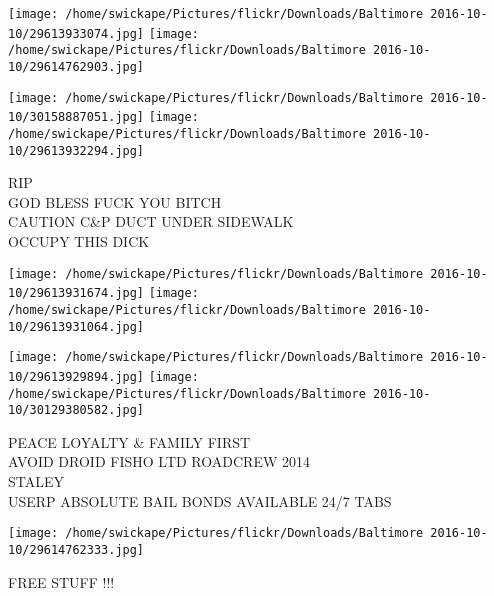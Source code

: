 \documentclass[10pt,letterpaper]{article}
\begin{document}
\texttt{[image: /home/swickape/Pictures/flickr/Downloads/Baltimore 2016-10-10/29613933074.jpg]}
\texttt{[image: /home/swickape/Pictures/flickr/Downloads/Baltimore 2016-10-10/29614762903.jpg]}

\texttt{[image: /home/swickape/Pictures/flickr/Downloads/Baltimore 2016-10-10/30158887051.jpg]}
\texttt{[image: /home/swickape/Pictures/flickr/Downloads/Baltimore 2016-10-10/29613932294.jpg]}

RIP\\
GOD BLESS FUCK YOU BITCH\\
CAUTION C\&P DUCT UNDER SIDEWALK\\
OCCUPY THIS DICK
\pagebreak

\texttt{[image: /home/swickape/Pictures/flickr/Downloads/Baltimore 2016-10-10/29613931674.jpg]}
\texttt{[image: /home/swickape/Pictures/flickr/Downloads/Baltimore 2016-10-10/29613931064.jpg]}

\texttt{[image: /home/swickape/Pictures/flickr/Downloads/Baltimore 2016-10-10/29613929894.jpg]}
\texttt{[image: /home/swickape/Pictures/flickr/Downloads/Baltimore 2016-10-10/30129380582.jpg]}

PEACE LOYALTY \& FAMILY FIRST\\
AVOID DROID FISHO LTD ROADCREW 2014\\
STALEY\\
USERP ABSOLUTE BAIL BONDS AVAILABLE 24/7 TABS
\pagebreak

\texttt{[image: /home/swickape/Pictures/flickr/Downloads/Baltimore 2016-10-10/29614762333.jpg]}

FREE STUFF !!!
\pagebreak
\end{document}
